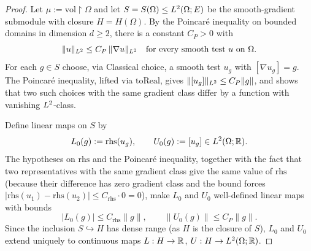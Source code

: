 \begin{proof}
\leanok
{}

Let $\mu := \mathrm{vol}\!\restriction\!\Omega$ and let $S = S(\Omega) \leq L^{2}(\Omega; E)$ be the smooth-gradient submodule with closure $H = H(\Omega)$. By the Poincar\'e inequality on bounded domains in dimension $d \geq 2$, there is a constant $C_P > 0$ with
\begin{equation*}
  \|u\|_{L^{2}} \leq C_P\,\|\nabla u\|_{L^{2}} \quad \text{for every smooth test } u \text{ on } \Omega.
\end{equation*}
For each $g \in S$ choose, via Classical choice, a smooth test $u_g$ with $[\nabla u_g] = g$. The Poincar\'e inequality, lifted via $\mathrm{toReal}$, gives $\|[u_g]\|_{L^{2}} \leq C_P \|g\|$, and shows that two such choices with the same gradient class differ by a function with vanishing $L^{2}$-class.

Define linear maps on $S$ by
\begin{equation*}
  L_0(g) := \mathrm{rhs}(u_g), \qquad U_0(g) := [u_g] \in L^{2}(\Omega; \mathbb{R}).
\end{equation*}
The hypotheses on $\mathrm{rhs}$ and the Poincar\'e inequality, together with the fact that two representatives with the same gradient class give the same value of $\mathrm{rhs}$ (because their difference has zero gradient class and the bound forces $|\mathrm{rhs}(u_1) - \mathrm{rhs}(u_2)| \leq C_{\mathrm{rhs}} \cdot 0 = 0$), make $L_0$ and $U_0$ well-defined linear maps with bounds
\begin{equation*}
  |L_0(g)| \leq C_{\mathrm{rhs}}\|g\|, \qquad \|U_0(g)\| \leq C_P\|g\|.
\end{equation*}
Since the inclusion $S \hookrightarrow H$ has dense range (as $H$ is the closure of $S$), $L_0$ and $U_0$ extend uniquely to continuous maps $L : H \to \mathbb{R}$, $U : H \to L^{2}(\Omega;\mathbb{R})$.


\end{proof}
